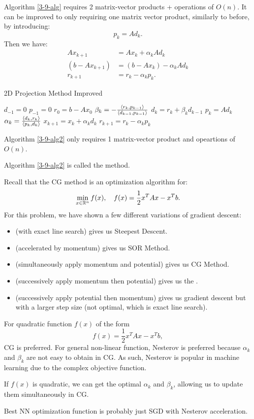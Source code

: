 \documentclass[../main/main.tex]{subfiles}
\begin{document}
Algorithm \ref{3-9-alg} requires 2 matrix-vector products + operations of $O(n)$. It can be improved to only requiring one matrix vector product, similarly to before, by introducing: \[
  p_{k} = Ad_{k}.
\] Then we have:
\begin{align*}
  Ax_{k+1} &= Ax_{k} + \alpha _{k}A d_{k}\\
  (b-Ax_{k+1})&=(b-Ax_{k})-\alpha _{k}Ad_{k}\\
 r_{k+1} &= r_{k}-\alpha _{k}p_{k}
  .\end{align*}
        \begin{algorithm}[h!]
	\caption{2D Projection Method Improved}
    \label{3-9-alg2}
	\begin{algorithmic}[1]
    \State $d_{-1}=0$
    \State $p_{-1}=0$
    \State $r_{0}=b-Ax_{0}$
      \State $\beta _{k} = - \frac{\left\langle{r_{k}},{p_{k-1}}\right\rangle}{\left\langle{d_{k-1}},{p_{k-1}}\right\rangle} $
      \State $d_{k}= r_{k}+\beta _{k}d_{k-1}$
      \State $p_{k} = Ad_{k}$
      \State $\alpha _{k} = \frac{\left\langle{d_{k}},{r_{k}}\right\rangle}{\left\langle{p_{k}},{d_{k}}\right\rangle} $
      \State $x_{k+1} = x_{k} +\alpha _{k}d_{k}$
      \State $r_{k+1}=r_{k}-\alpha _{k}p_{k}$
      \EndFor
	\end{algorithmic}
	\end{algorithm}

  \begin{remark}
Algorithm \ref{3-9-alg2} only requires 1 matrix-vector product and opeartions of $O(n)$.
  \end{remark}
\begin{definition}
Algorithm \ref{3-9-alg2} is called the  method. 
\end{definition}
Recall that the CG method is an optimization algorithm for: \[
\min _{x\in \mathbb{R} ^{n}}f(x), \quad  f(x) = \frac{1}{2} x^{T}Ax - x^{T} b.
\] For this problem, we have shown a few different variations of gradient descent:
\begin{itemize}
        \item (with exact line search) gives us Steepest Descent.
        \item (accelerated by momentum) gives us SOR Method.
        \item (simultaneously apply momentum and potential) gives us CG Method.
        \item (successively apply momentum then potential) gives us the . 
        \item (successively apply potential then momentum) gives us gradient descent but with a larger step size (not optimal, which is exact line search).
\end{itemize}
For quadratic function $f(x)$ of the form \[
f(x) = \frac{1}{2} x^{T}Ax - x^{T} b,
\] CG is preferred. For general non-linear function, Nesterov is preferred because $\alpha _{k}$ and $\beta _{k}$ are not easy to obtain in CG. As such, Nesterov is popular in machine learning due to the complex objective function.

\begin{remark}
  If $f(x)$ is quadratic, we can get the optimal $\alpha _{k}$ and $\beta _{k}$, allowing us to update them simultaneously in CG.
\end{remark}
\begin{remark}
Best NN optimization function is probably just SGD with Nesterov acceleration.
\end{remark}
\end{document}
